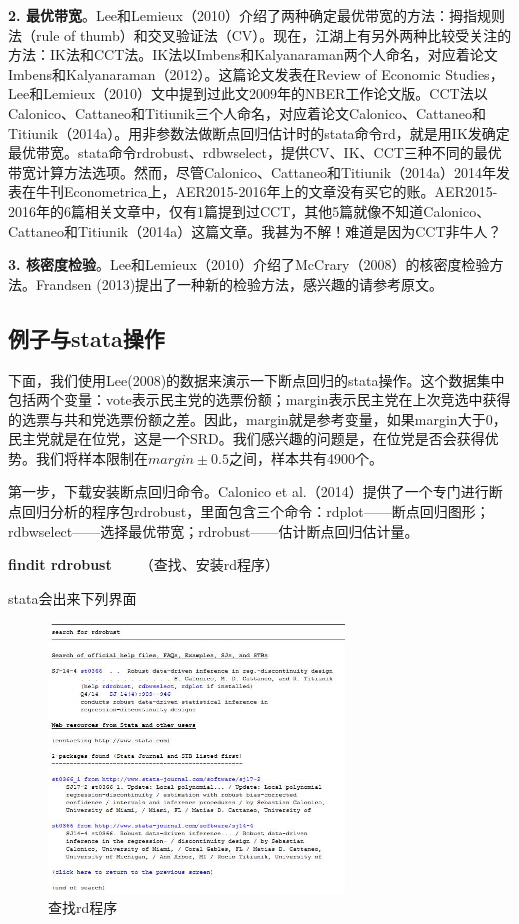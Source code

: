 \documentclass[cn,10pt,math=newtx,citestyle=gb7714-2015,bibstyle=gb7714-2015]{elegantbook}
\begin{document}
	\textbf{2. 最优带宽}。Lee和Lemieux（2010）介绍了两种确定最优带宽的方法：拇指规则法（rule of thumb）和交叉验证法（CV）。现在，江湖上有另外两种比较受关注的方法：IK法和CCT法。IK法以Imbens和Kalyanaraman两个人命名，对应着论文Imbens和Kalyanaraman（2012）。这篇论文发表在Review of Economic Studies，Lee和Lemieux（2010）文中提到过此文2009年的NBER工作论文版。CCT法以Calonico、Cattaneo和Titiunik三个人命名，对应着论文Calonico、Cattaneo和Titiunik（2014a）。用非参数法做断点回归估计时的stata命令rd，就是用IK发确定最优带宽。stata命令rdrobust、rdbwselect，提供CV、IK、CCT三种不同的最优带宽计算方法选项。然而，尽管Calonico、Cattaneo和Titiunik（2014a）2014年发表在牛刊Econometrica上，AER2015-2016年上的文章没有买它的账。AER2015-2016年的6篇相关文章中，仅有1篇提到过CCT，其他5篇就像不知道Calonico、Cattaneo和Titiunik（2014a）这篇文章。我甚为不解！难道是因为CCT非牛人？
	
	\textbf{3. 核密度检验}。Lee和Lemieux（2010）介绍了McCrary（2008）的核密度检验方法。Frandsen (2013)提出了一种新的检验方法，感兴趣的请参考原文。
	
	\subsection{例子与stata操作}
	
	下面，我们使用Lee(2008)的数据来演示一下断点回归的stata操作。这个数据集中包括两个变量：vote表示民主党的选票份额；margin表示民主党在上次竞选中获得的选票与共和党选票份额之差。因此，margin就是参考变量，如果margin大于0，民主党就是在位党，这是一个SRD。我们感兴趣的问题是，在位党是否会获得优势。我们将样本限制在$margin\pm0.5$之间，样本共有4900个。
	
	第一步，下载安装断点回归命令。Calonico et al.（2014）提供了一个专门进行断点回归分析的程序包rdrobust，里面包含三个命令：rdplot——断点回归图形；rdbwselect——选择最优带宽；rdrobust——估计断点回归估计量。
	
	\textbf{findit rdrobust}~~~~（查找、安装rd程序）
	
	stata会出来下列界面
	
	\begin{figure}[htbp]
		\centering
		\includegraphics[width=0.7\textwidth]{findit.jpg}
		\caption{查找rd程序}\label{fig:digit}
	\end{figure}
	
\end{document}
